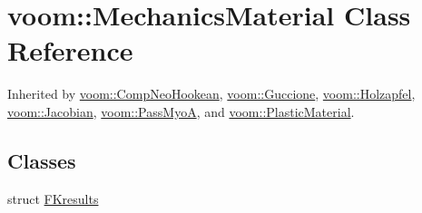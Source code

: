 \hypertarget{classvoom_1_1_mechanics_material}{
\section{voom::MechanicsMaterial Class Reference}
\label{classvoom_1_1_mechanics_material}
}


Inherited by \hyperlink{classvoom_1_1_comp_neo_hookean}{voom::CompNeoHookean}, \hyperlink{classvoom_1_1_guccione}{voom::Guccione}, \hyperlink{classvoom_1_1_holzapfel}{voom::Holzapfel}, \hyperlink{classvoom_1_1_jacobian}{voom::Jacobian}, \hyperlink{classvoom_1_1_pass_myo_a}{voom::PassMyoA}, and \hyperlink{classvoom_1_1_plastic_material}{voom::PlasticMaterial}.\subsection*{Classes}
\begin{DoxyCompactItemize}
\item 
struct \hyperlink{structvoom_1_1_mechanics_material_1_1_f_kresults}{FKresults}
\end{DoxyCompactItemize}
